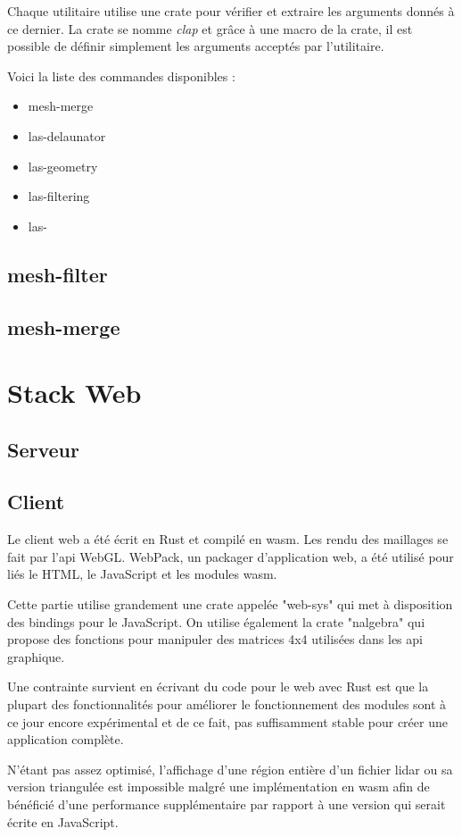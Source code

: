 Chaque utilitaire utilise une crate pour vérifier et extraire les arguments
donnés à ce dernier. La crate se nomme \textit{clap} et grâce à une macro de la
crate, il est possible de définir simplement les arguments acceptés par 
l'utilitaire.

Voici la liste des commandes disponibles :
\begin{itemize}
	\item mesh-merge
	\item las-delaunator
	\item las-geometry
	\item las-filtering
	\item las-
\end{itemize}

\subsection{mesh-filter}
\subsection{mesh-merge}

\section{Stack Web}
\subsection{Serveur}


\subsection{Client}

Le client web a été écrit en Rust et compilé en \gls{wasm}. Les rendu des
maillages se fait par l'api WebGL. WebPack, un packager d'application web, a été utilisé pour liés le HTML, le JavaScript et les modules \gls{wasm}. 

Cette partie utilise grandement une crate appelée "web-sys" qui met à disposition des bindings pour le JavaScript.
On utilise également la crate "nalgebra" qui propose des fonctions pour manipuler des matrices 4x4 utilisées dans les \gls{api} graphique.

Une contrainte survient en écrivant du code pour le web avec Rust est que la plupart des fonctionnalités pour améliorer le fonctionnement des modules sont à ce jour encore expérimental et de ce fait, pas suffisamment stable pour créer une application complète.

N'étant pas assez optimisé, l'affichage d'une région entière d'un fichier \gls{lidar} ou sa version triangulée est impossible malgré une implémentation en \gls{wasm} afin de bénéficié d'une performance supplémentaire par rapport à une version qui serait écrite en JavaScript.
